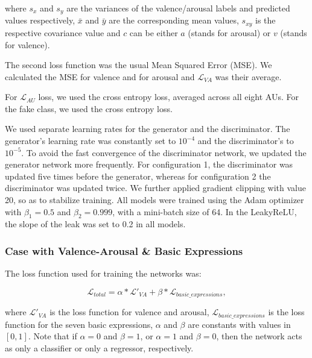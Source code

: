 \documentclass[a4paper, 10pt, conference]{ieeeconf}      %
\begin{document}
\noindent
where $s_x$ and $s_y$ are the variances of the valence/arousal labels and predicted values respectively, $\bar{x}$ and $\bar{y}$ are the corresponding mean values,  $s_{xy}$ is the respective covariance value and $c$ can be either $a$ (stands for arousal) or $v$ (stands for valence).

The second loss function was the usual Mean Squared Error (MSE). We calculated the MSE for valence and for arousal and $\mathcal{L}_{VA}$ was their average.

For $\mathcal{L}_{AU}$ loss, we used the cross entropy loss, averaged across all eight AUs. 
For the fake class, we used the cross entropy loss.

We used separate learning rates for the generator and the discriminator. The generator's learning rate was constantly set to  $10^{-4}$ and the discriminator's to $10^{-5}$. To avoid the fast convergence of the discriminator network, we updated the generator network more frequently. For configuration 1, the discriminator was updated five times before the generator, whereas for configuration 2 the discriminator was updated twice. We further applied gradient clipping with value 20, so as to stabilize training. All models were trained using the Adam optimizer with $\beta_1 = 0.5$ and $\beta_2 = 0.999$, with a mini-batch size of 64. In the LeakyReLU, the slope of the leak was set to 0.2 in all models. 









\subsubsection{Case with Valence-Arousal \& Basic Expressions}\label{loss_va_au}

The loss function used for training the networks was: 

\vskip -0.3cm

\begin{equation} \label{eq:1}
\mathcal{L}_{total} = \alpha * \mathcal{L'}_{VA} + \beta * \mathcal{L}_{basic\_expressions},
\end{equation}

\noindent
where $\mathcal{L'}_{VA}$ is the loss function for valence and arousal, $\mathcal{L}_{basic\_expressions}$ is the loss function for the seven basic expressions, $\alpha$ and $\beta$ are constants with values in $[0,1]$. Note that if $\alpha=0$ and $\beta=1$, or $\alpha=1$ and $\beta=0$, then the network acts as only a classifier or only a regressor, respectively.
\end{document}
